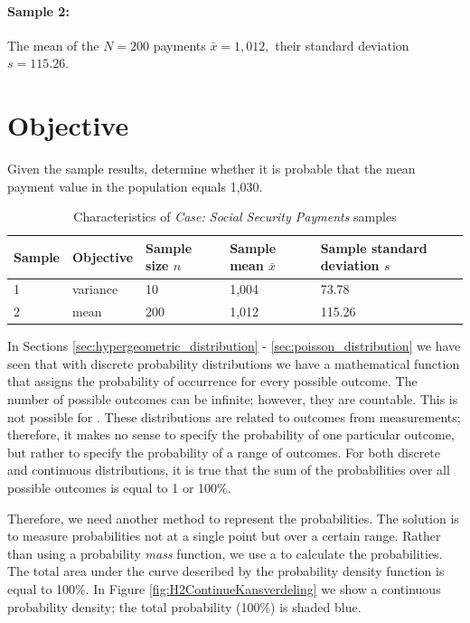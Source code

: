 \begin{mdframed}[hidealllines=true,backgroundcolor=KPMG_blue!10, innerleftmargin=0.3cm]
\paragraph{Sample 2:} The mean of the $N = 200$ payments $\bar{x} = 1,012,$ their standard deviation $s = 115.26$.

\section*{Objective}
Given the sample results, determine whether it is probable that the mean payment value in the population equals 1,030.

\end{mdframed}

\begin{table}[htbp]
\begin{tabularx}{\textwidth}{l l Y Y Y}
\toprule
Sample & Objective &
Sample size $n$ &
Sample mean $\bar{x}$ &
Sample standard deviation $s$ \\
 & variance & 10  & 1,004 &  73.78 \\
2 & mean     & 200 & 1,012 & 115.26 \\
\bottomrule
\end{tabularx}
\caption{Characteristics of \emph{Case: Social Security Payments} samples}
\label{tab:characteristicsSocSecurity}
\end{table}

In Sections \ref{sec:hypergeometric_distribution} - \ref{sec:poisson_distribution} we have seen that with discrete probability distributions we have a mathematical function that assigns the probability of occurrence for every possible outcome. The number of possible outcomes can be infinite; however, they are countable. This is not possible for . These distributions are related to outcomes from measurements; therefore, it makes no sense to specify the probability of one particular outcome, but rather to specify the probability of a range of outcomes. For both discrete and continuous distributions, it is true that the sum of the probabilities over all possible outcomes is equal to 1 or 100\%.  

Therefore, we need another method to represent the probabilities. The solution is to measure probabilities not at a single point but over a certain range. Rather than using a probability \emph{mass} function, we use a  to calculate the probabilities. The total area under the curve described by the probability density function is equal to 100\%. In Figure \ref{fig:H2ContinueKansverdeling} we show a continuous probability density; the total probability (100\%) is shaded blue.

